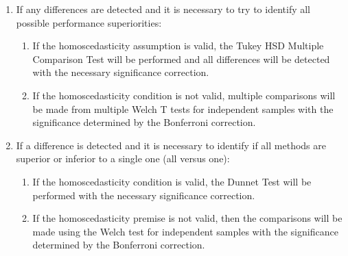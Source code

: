 \begin{enumerate}
\begin{enumerate}
					\item If any differences are detected and it is necessary to try to identify all possible performance superiorities:
					\begin{enumerate}
						\item If the homoscedasticity assumption is valid, the Tukey HSD Multiple Comparison Test will be performed and all differences will be detected with the necessary significance correction.
						\item If the homoscedasticity condition is not valid, multiple comparisons will be made from multiple Welch T tests for independent samples with the significance determined by the Bonferroni correction.
					\end{enumerate}
					\item If a difference is detected and it is necessary to identify if all methods are superior or inferior to a single one (all versus one):
					\begin{enumerate}
						\item If the homoscedasticity condition is valid, the Dunnet Test will be performed with the necessary significance correction.
						\item If the homoscedasticity premise is not valid, then the comparisons will be made using the Welch test for independent samples with the significance determined by the Bonferroni correction.

\end{enumerate}
\end{enumerate}
\end{enumerate}
